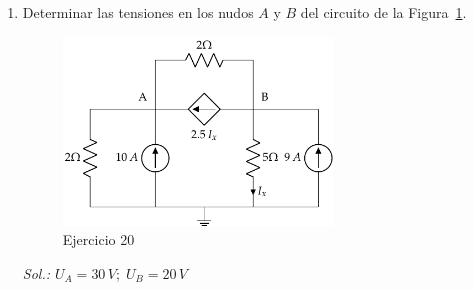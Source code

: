 \begin{enumerate}
\item Determinar las tensiones en los nudos $A$ y $B$ del circuito de la Figura~\ref{fig.ej14_BT1}.
\begin{figure}[H]
    \centering
    \includegraphics[height=5cm]{../figs/ej14_BT1.pdf}
    \caption{Ejercicio 20}
    \label{fig.ej14_BT1}
\end{figure}
\emph{Sol.: $U_A=30\,V;\;U_B=20\,V$}








\end{enumerate}
